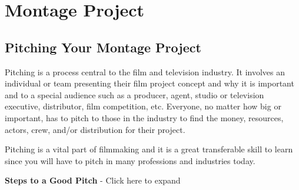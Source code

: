 \documentclass[
]{book}
\begin{document}
\hypertarget{montage-project}{%
\section{Montage Project}\label{montage-project}}

\hypertarget{pitching-your-montage-project}{%
\subsection*{Pitching Your Montage Project}\label{pitching-your-montage-project}}

Pitching is a process central to the film and television industry. It involves an individual or team presenting their film project concept and why it is important and to a special audience such as a producer, agent, studio or television executive, distributor, film competition, etc. Everyone, no matter how big or important, has to pitch to those in the industry to find the money, resources, actors, crew, and/or distribution for their project.

Pitching is a vital part of filmmaking and it is a great transferable skill to learn since you will have to pitch in many professions and industries today.

\textbf{Steps to a Good Pitch} - Click here to expand
\end{document}
